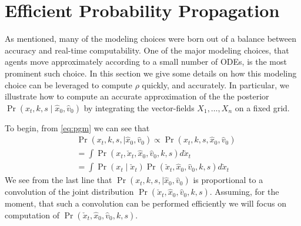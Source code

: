 \documentclass[conference]{IEEEtran}
\begin{document}
\section{Efficient Probability Propagation} \label{sec:efficient}
As mentioned, many of the modeling choices were born out of a balance between accuracy and real-time computability.
One of the major modeling choices, that agents move approximately according to a small number of ODEs, is the most prominent such choice.
In this section we give some details on how this modeling choice can be leveraged to compute $\rho$ quickly, and accurately.
In particular, we illustrate how to compute an accurate approximation of the the posterior $\Pr( x_t, k,s \mid \hat{x}_0, \hat{v}_0)$
by integrating the vector-fields $X_1, \dots, X_n$ on a fixed grid.

To begin, from \eqref{eq:pgm} we can see that
\begin{align}
	&\Pr( x_t, k,s,\mid \hat{x}_0, \hat{v}_0) \propto \Pr( x_t, k,s,\hat{x}_0, \hat{v}_0) \\
	&= \int \Pr( x_t, \check{x}_t , \hat{x}_0, \hat{v}_0, k,s) d\check{x}_t \\
	&= \int \Pr( x_t \mid \check{x}_t ) \Pr(\check{x}_t , \hat{x}_0, \hat{v}_0, k,s) d\check{x}_t \label{eq:convolve}
\end{align}
We see from the last line that $\Pr( x_t, k,s,\mid \hat{x}_0, \hat{v}_0)$ is proportional to a convolution of the joint distribution $\Pr( \check{x}_t , \hat{x}_0, \hat{v}_0, k,s)$.
Assuming, for the moment, that such a convolution can be performed efficiently we will focus on computation of $\Pr( \check{x}_t , \hat{x}_0, \hat{v}_0, k,s)$.
\end{document}

